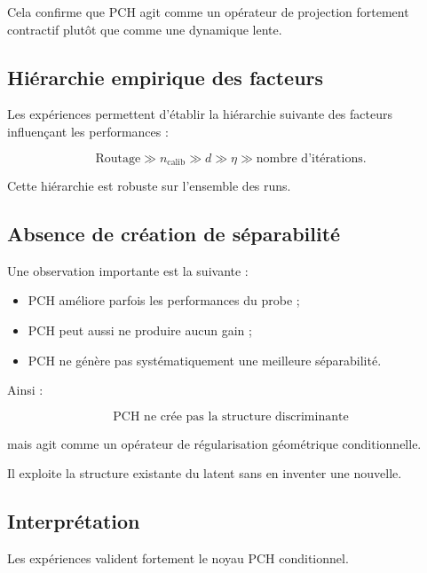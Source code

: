 \documentclass[11pt,a4paper]{article}
\newcommand{\1}{\mathbf 1}
\begin{document}
Cela confirme que PCH agit comme un opérateur de projection fortement contractif plutôt que comme une dynamique lente.

\subsection{Hiérarchie empirique des facteurs}

Les expériences permettent d’établir la hiérarchie suivante des facteurs influençant les performances :

\[
\text{Routage}
\gg
n_{\mathrm{calib}}
\gg
d
\gg
\eta
\gg
\text{nombre d’itérations}.
\]

Cette hiérarchie est robuste sur l’ensemble des runs.

\subsection{Absence de création de séparabilité}

Une observation importante est la suivante :

\begin{itemize}
\item PCH améliore parfois les performances du probe ;
\item PCH peut aussi ne produire aucun gain ;
\item PCH ne génère pas systématiquement une meilleure séparabilité.
\end{itemize}

Ainsi :

\[
\text{PCH ne crée pas la structure discriminante}
\]

mais agit comme un opérateur de régularisation géométrique conditionnelle.

Il exploite la structure existante du latent sans en inventer une nouvelle.

\subsection{Interprétation}

Les expériences valident fortement le noyau PCH conditionnel.
\end{document}
